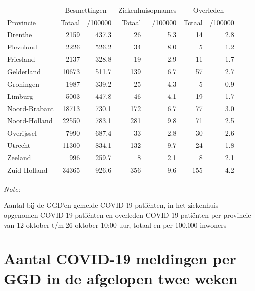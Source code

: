 \documentclass[
  english,
  man,floatsintext]{apa6}
\begin{document}
\begin{table}[H]
\centering
\begin{threeparttable}
\begin{tabular}{lrrrrrr}
\toprule
\multicolumn{1}{c}{ } & \multicolumn{2}{c}{Besmettingen} & \multicolumn{2}{c}{Ziekenhuisopnames} & \multicolumn{2}{c}{Overleden} \\
\cmidrule(l{3pt}r{3pt}){2-3} \cmidrule(l{3pt}r{3pt}){4-5} \cmidrule(l{3pt}r{3pt}){6-7}
Provincie & Totaal & /100000 & Totaal & /100000 & Totaal & /100000\\
\midrule
Drenthe & 2159 & 437.3 & 26 & 5.3 & 14 & 2.8\\
Flevoland & 2226 & 526.2 & 34 & 8.0 & 5 & 1.2\\
Friesland & 2137 & 328.8 & 19 & 2.9 & 11 & 1.7\\
Gelderland & 10673 & 511.7 & 139 & 6.7 & 57 & 2.7\\
Groningen & 1987 & 339.2 & 25 & 4.3 & 5 & 0.9\\
Limburg & 5003 & 447.8 & 46 & 4.1 & 19 & 1.7\\
Noord-Brabant & 18713 & 730.1 & 172 & 6.7 & 77 & 3.0\\
Noord-Holland & 22550 & 783.1 & 281 & 9.8 & 71 & 2.5\\
Overijssel & 7990 & 687.4 & 33 & 2.8 & 30 & 2.6\\
Utrecht & 11300 & 834.1 & 132 & 9.7 & 24 & 1.8\\
Zeeland & 996 & 259.7 & 8 & 2.1 & 8 & 2.1\\
Zuid-Holland & 34365 & 926.6 & 356 & 9.6 & 155 & 4.2\\
\bottomrule
\end{tabular}
\begin{tablenotes}
\item \textit{Note: } 
\item Aantal bij de GGD’en gemelde COVID-19 patiënten, in het ziekenhuis opgenomen COVID-19 patiënten en overleden COVID-19 patiënten per provincie van 12 oktober t/m 26 oktober 10:00 uur, totaal en per 100.000 inwoners
\end{tablenotes}
\end{threeparttable}
\end{table}

\newpage

\hypertarget{aantal-covid-19-meldingen-per-ggd-in-de-afgelopen-twee-weken}{%
\section{Aantal COVID-19 meldingen per GGD in de afgelopen twee weken}\label{aantal-covid-19-meldingen-per-ggd-in-de-afgelopen-twee-weken}}
\end{document}
